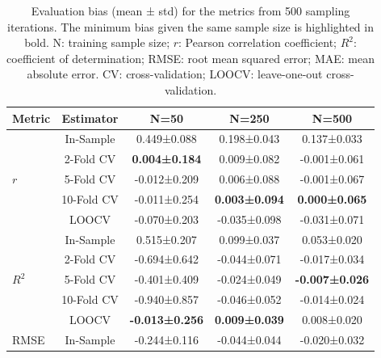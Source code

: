 \begin{table}[H]
    \caption{Evaluation bias (mean ± std) for the metrics from 500 sampling iterations. The minimum bias given the same sample size is highlighted in bold. N: training sample size; $r$: Pearson correlation coefficient; $R^2$: coefficient of determination; RMSE: root mean squared error; MAE: mean absolute error. CV: cross-validation; LOOCV: leave-one-out cross-validation.}
    \centering
    \begin{tabular}{lcccc}
        \toprule
        \textbf{Metric} & \textbf{Estimator} & \textbf{N=50} & \textbf{N=250} & \textbf{N=500} \\
        \midrule
        \multirow{5}{*}{$r$} 
            & In-Sample
                & 0.449±0.088
                & 0.198±0.043
                & 0.137±0.033 \\
            & 2-Fold CV
                & \textbf{0.004±0.184}
                & 0.009±0.082
                & -0.001±0.061 \\
            & 5-Fold CV
                & -0.012±0.209
                & 0.006±0.088
                & -0.001±0.067 \\
            & 10-Fold CV
                & -0.011±0.254
                & \textbf{0.003±0.094}
                & \textbf{0.000±0.065} \\
            & LOOCV
                & -0.070±0.203
                & -0.035±0.098
                & -0.031±0.071 \\
        \midrule
        \multirow{5}{*}{$R^2$}
            & In-Sample
                & 0.515±0.207
                & 0.099±0.037
                & 0.053±0.020 \\
            & 2-Fold CV
                & -0.694±0.642
                & -0.044±0.071
                & -0.017±0.034 \\
            & 5-Fold CV
                & -0.401±0.409
                & -0.024±0.049
                & \textbf{-0.007±0.026} \\
            & 10-Fold CV
                & -0.940±0.857
                & -0.046±0.052
                & -0.014±0.024 \\
            & LOOCV
                & \textbf{-0.013±0.256}
                & \textbf{0.009±0.039}
                & 0.008±0.020 \\
        \midrule
        \multirow{5}{*}{RMSE}
                & In-Sample
                    & -0.244±0.116
                    & -0.044±0.044
                    & -0.020±0.032 \\

\end{tabular}
\end{table}
